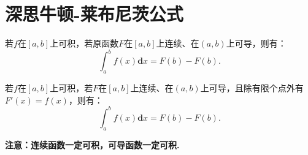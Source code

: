 \section{深思牛顿-莱布尼茨公式}

\begin{theorem}[牛顿-莱布尼茨公式]
	若$f$在$[a,b]$上可积，若原函数$F$在$[a,b]$上连续、在$(a,b)$上可导，则有：
	\begin{equation}
		\int_{a}^{b}f(x)\textbf{d}x = F(b)-F(b).
	\end{equation}
\end{theorem}

\begin{proposition}
	若$f$在$[a,b]$上可积，若$F$在$[a,b]$上连续、在$(a,b)$上可导，且除有限个点外有$F'(x)=f(x)$，则有：
	\begin{equation}
		\int_{a}^{b}f(x)\textbf{d}x = F(b)-F(b).
	\end{equation}
\end{proposition}

\textbf{注意：连续函数一定可积，可导函数一定可积.}


